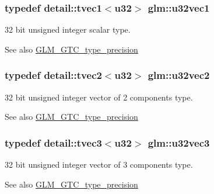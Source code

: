\subsubsection[{u32vec1}]{\setlength{\rightskip}{0pt plus 5cm}typedef detail\+::tvec1$<$u32$>$ {\bf glm\+::u32vec1}}\label{group__gtc__type__precision_ga690033f989275bb90f793a785dc45521}
32 bit unsigned integer scalar type. \begin{DoxySeeAlso}{See also}
\hyperlink{group__gtc__type__precision}{G\+L\+M\+\_\+\+G\+T\+C\+\_\+type\+\_\+precision} 
\end{DoxySeeAlso}
\hypertarget{group__gtc__type__precision_ga6cad9c800c714098d4adc0ee7746b48c}{}
\subsubsection[{u32vec2}]{\setlength{\rightskip}{0pt plus 5cm}typedef detail\+::tvec2$<$u32$>$ {\bf glm\+::u32vec2}}\label{group__gtc__type__precision_ga6cad9c800c714098d4adc0ee7746b48c}
32 bit unsigned integer vector of 2 components type. \begin{DoxySeeAlso}{See also}
\hyperlink{group__gtc__type__precision}{G\+L\+M\+\_\+\+G\+T\+C\+\_\+type\+\_\+precision} 
\end{DoxySeeAlso}
\hypertarget{group__gtc__type__precision_gac56c189cd9527b002389e43076f30805}{}
\subsubsection[{u32vec3}]{\setlength{\rightskip}{0pt plus 5cm}typedef detail\+::tvec3$<$u32$>$ {\bf glm\+::u32vec3}}\label{group__gtc__type__precision_gac56c189cd9527b002389e43076f30805}
32 bit unsigned integer vector of 3 components type. \begin{DoxySeeAlso}{See also}
\hyperlink{group__gtc__type__precision}{G\+L\+M\+\_\+\+G\+T\+C\+\_\+type\+\_\+precision} 
\end{DoxySeeAlso}
\hypertarget{group__gtc__type__precision_ga5cd7923918307032d87d7d5ce0257c15}{}
